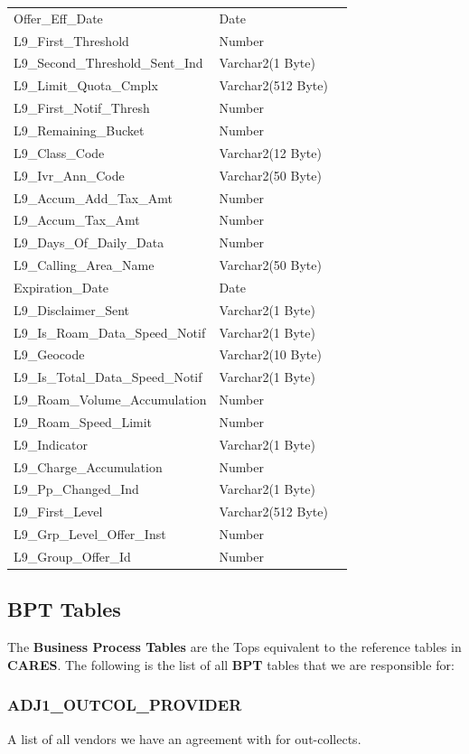 \documentclass[12pt,twoside]{article}
\begin{document}
\begin{longtable}{l|l|l}
Offer\_Eff\_Date & Date & \\
L9\_First\_Threshold & Number & \\
L9\_Second\_Threshold\_Sent\_Ind & Varchar2(1 Byte) & \\
L9\_Limit\_Quota\_Cmplx & Varchar2(512 Byte) & \\
L9\_First\_Notif\_Thresh & Number & \\
L9\_Remaining\_Bucket & Number & \\
L9\_Class\_Code & Varchar2(12 Byte) & \\
L9\_Ivr\_Ann\_Code & Varchar2(50 Byte) & \\
L9\_Accum\_Add\_Tax\_Amt & Number & \\
L9\_Accum\_Tax\_Amt & Number & \\
L9\_Days\_Of\_Daily\_Data & Number & \\
L9\_Calling\_Area\_Name & Varchar2(50 Byte) & \\
Expiration\_Date & Date & \\
L9\_Disclaimer\_Sent & Varchar2(1 Byte) & \\
L9\_Is\_Roam\_Data\_Speed\_Notif & Varchar2(1 Byte) & \\
L9\_Geocode & Varchar2(10 Byte) & \\
L9\_Is\_Total\_Data\_Speed\_Notif & Varchar2(1 Byte) & \\
L9\_Roam\_Volume\_Accumulation & Number & \\
L9\_Roam\_Speed\_Limit & Number & \\
L9\_Indicator & Varchar2(1 Byte) & \\
L9\_Charge\_Accumulation & Number & \\
L9\_Pp\_Changed\_Ind & Varchar2(1 Byte) & \\
L9\_First\_Level & Varchar2(512 Byte) & \\
L9\_Grp\_Level\_Offer\_Inst & Number & \\
L9\_Group\_Offer\_Id & Number & \\
\hline
\end{longtable}

\normalsize
\newpage 
\subsection{BPT Tables}
\label{sec:orgheadline51}
The \textbf{Business Process Tables} are the Tops equivalent to the
reference tables in \textbf{CARES}. The following is the list of all
\textbf{BPT} tables that we are responsible for:
\subsubsection{ADJ1\_OUTCOL\_PROVIDER}
\label{sec:orgheadline38}
A list of all vendors we have an agreement with for out-collects.
\footnotesize
\end{document}
